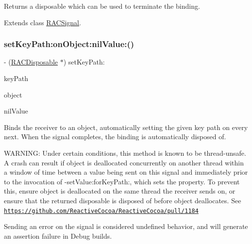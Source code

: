 Returns a disposable which can be used to terminate the binding. 

Extends class \mbox{\hyperlink{interface_r_a_c_signal_a3d59cca19be3e985aa5a08cb0386faeb}{R\+A\+C\+Signal}}.

\mbox{\label{category_r_a_c_signal_07_operations_08_a3d59cca19be3e985aa5a08cb0386faeb}} 
\subsubsection{\texorpdfstring{set\+Key\+Path\+:on\+Object\+:nil\+Value\+:()}{setKeyPath:onObject:nilValue:()}\hspace{0.1cm}{\footnotesize\ttfamily [2/3]}}
{\footnotesize\ttfamily -\/ (\mbox{\hyperlink{interface_r_a_c_disposable}{R\+A\+C\+Disposable}} $\ast$) set\+Key\+Path\+: \begin{DoxyParamCaption}\item[{(N\+S\+String $\ast$)}]{key\+Path }\item[{onObject:(N\+S\+Object $\ast$)}]{object }\item[{nilValue:(id)}]{nil\+Value }\end{DoxyParamCaption}}

Binds the receiver to an object, automatically setting the given key path on every {\ttfamily next}. When the signal completes, the binding is automatically disposed of.

W\+A\+R\+N\+I\+NG\+: Under certain conditions, this method is known to be thread-\/unsafe. A crash can result if {\ttfamily object} is deallocated concurrently on another thread within a window of time between a value being sent on this signal and immediately prior to the invocation of -\/set\+Value\+:for\+Key\+Path\+:, which sets the property. To prevent this, ensure {\ttfamily object} is deallocated on the same thread the receiver sends on, or ensure that the returned disposable is disposed of before {\ttfamily object} deallocates. See \href{https://github.com/ReactiveCocoa/ReactiveCocoa/pull/1184}{\tt https\+://github.\+com/\+Reactive\+Cocoa/\+Reactive\+Cocoa/pull/1184}

Sending an error on the signal is considered undefined behavior, and will generate an assertion failure in Debug builds.

